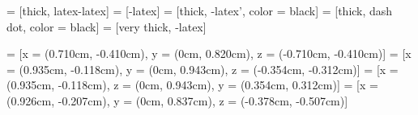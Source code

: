 
 = [thick, latex-latex]              %
 = [-latex]                           %
 = [thick, -latex', color = black]     %
 = [thick, dash dot, color = black] %
 = [very thick, -latex]              %


 = [x = {(0.710cm, -0.410cm)}, y = {(0cm, 0.820cm)}, z = {(-0.710cm, -0.410cm)}]
 = [x = {(0.935cm, -0.118cm)}, y = {(0cm, 0.943cm)}, z = {(-0.354cm, -0.312cm)}]
 = [x = {(0.935cm, -0.118cm)}, z = {(0cm, 0.943cm)}, y = {(0.354cm, 0.312cm)}]
 = [x = {(0.926cm, -0.207cm)}, y = {(0cm, 0.837cm)}, z = {(-0.378cm, -0.507cm)}]





\pgfplotsset{compat = 1.18}


\renewcommand{\labelitemi}{\normalfont\bfseries{--}}

